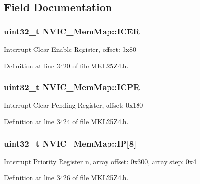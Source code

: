 \subsection{Field Documentation}
\subsubsection[{\texorpdfstring{I\+C\+ER}{ICER}}]{\setlength{\rightskip}{0pt plus 5cm}uint32\+\_\+t N\+V\+I\+C\+\_\+\+Mem\+Map\+::\+I\+C\+ER}\hypertarget{struct_n_v_i_c___mem_map_a0def6b0bebb3e2e35a180f31f74baef8}{}\label{struct_n_v_i_c___mem_map_a0def6b0bebb3e2e35a180f31f74baef8}
Interrupt Clear Enable Register, offset\+: 0x80 

Definition at line 3420 of file M\+K\+L25\+Z4.\+h.

\subsubsection[{\texorpdfstring{I\+C\+PR}{ICPR}}]{\setlength{\rightskip}{0pt plus 5cm}uint32\+\_\+t N\+V\+I\+C\+\_\+\+Mem\+Map\+::\+I\+C\+PR}\hypertarget{struct_n_v_i_c___mem_map_a47b16d0ffa924a50639a73c0494913b0}{}\label{struct_n_v_i_c___mem_map_a47b16d0ffa924a50639a73c0494913b0}
Interrupt Clear Pending Register, offset\+: 0x180 

Definition at line 3424 of file M\+K\+L25\+Z4.\+h.

\subsubsection[{\texorpdfstring{IP}{IP}}]{\setlength{\rightskip}{0pt plus 5cm}uint32\+\_\+t N\+V\+I\+C\+\_\+\+Mem\+Map\+::\+IP\mbox{[}8\mbox{]}}\hypertarget{struct_n_v_i_c___mem_map_a4dae41a548b9558e16c2280c8695a6f8}{}\label{struct_n_v_i_c___mem_map_a4dae41a548b9558e16c2280c8695a6f8}
Interrupt Priority Register n, array offset\+: 0x300, array step\+: 0x4 

Definition at line 3426 of file M\+K\+L25\+Z4.\+h.

